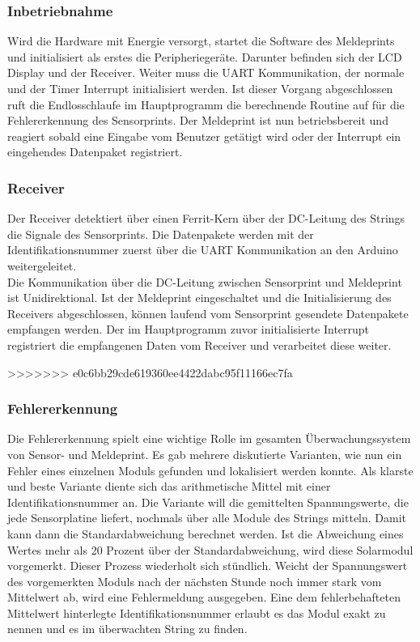 \subsubsection{Inbetriebnahme}
Wird die Hardware mit Energie versorgt, startet die Software des Meldeprints und initialisiert als erstes die Peripheriegeräte. Darunter befinden sich der LCD Display und der Receiver. Weiter muss die UART Kommunikation, der normale und der Timer Interrupt initialisiert werden. Ist dieser Vorgang abgeschlossen ruft die Endlosschlaufe im Hauptprogramm die berechnende Routine auf für die Fehlererkennung des Sensorprints. Der Meldeprint ist nun betriebsbereit und reagiert sobald eine Eingabe vom Benutzer getätigt wird oder der Interrupt ein eingehendes Datenpaket registriert.

\subsubsection{Receiver}
Der Receiver detektiert über einen Ferrit-Kern über der DC-Leitung des Strings die Signale des Sensorprints. Die Datenpakete werden mit der Identifikationsnummer zuerst über die UART Kommunikation an den Arduino weitergeleitet.\\
Die Kommunikation über die DC-Leitung zwischen Sensorprint und Meldeprint ist Unidirektional. Ist der Meldeprint eingeschaltet und die Initialisierung des Receivers abgeschlossen, können laufend vom Sensorprint gesendete Datenpakete empfangen werden. Der im Hauptprogramm zuvor initialisierte Interrupt registriert die empfangenen Daten vom Receiver und verarbeitet diese weiter.

>>>>>>> e0c6bb29cde619360ee4422dabc95f11166ec7fa
\subsubsection{Fehlererkennung}
Die Fehlererkennung spielt eine wichtige Rolle im gesamten Überwachungssystem von Sensor- und Meldeprint. Es gab mehrere diskutierte Varianten, wie nun ein Fehler eines einzelnen Moduls gefunden und lokalisiert werden konnte. Als klarste und beste Variante diente sich das arithmetische Mittel mit einer Identifikationsnummer an. Die Variante will die gemittelten Spannungswerte, die jede Sensorplatine liefert, nochmals über alle Module des Strings mitteln. Damit kann dann die Standardabweichung berechnet werden. Ist die Abweichung eines Wertes mehr als 20 Prozent über der Standardabweichung, wird diese Solarmodul vorgemerkt. Dieser Prozess  wiederholt sich stündlich. Weicht der Spannungswert des vorgemerkten Moduls nach der nächsten Stunde noch immer stark vom Mittelwert ab, wird eine Fehlermeldung ausgegeben. Eine dem fehlerbehafteten Mittelwert hinterlegte Identifikationsnummer erlaubt es das Modul exakt zu nennen und es im überwachten String zu finden.

